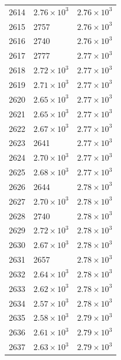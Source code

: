 \begin{table}[H]
\begin{tabular}{lll}
2614 & $\displaystyle 2.76 \times 10^{3}$ & $\displaystyle 2.76 \times 10^{3}$ \\
2615 & 2757 & $\displaystyle 2.76 \times 10^{3}$ \\
2616 & 2740 & $\displaystyle 2.76 \times 10^{3}$ \\
2617 & 2777 & $\displaystyle 2.77 \times 10^{3}$ \\
2618 & $\displaystyle 2.72 \times 10^{3}$ & $\displaystyle 2.77 \times 10^{3}$ \\
2619 & $\displaystyle 2.71 \times 10^{3}$ & $\displaystyle 2.77 \times 10^{3}$ \\
2620 & $\displaystyle 2.65 \times 10^{3}$ & $\displaystyle 2.77 \times 10^{3}$ \\
2621 & $\displaystyle 2.65 \times 10^{3}$ & $\displaystyle 2.77 \times 10^{3}$ \\
2622 & $\displaystyle 2.67 \times 10^{3}$ & $\displaystyle 2.77 \times 10^{3}$ \\
2623 & 2641 & $\displaystyle 2.77 \times 10^{3}$ \\
2624 & $\displaystyle 2.70 \times 10^{3}$ & $\displaystyle 2.77 \times 10^{3}$ \\
2625 & $\displaystyle 2.68 \times 10^{3}$ & $\displaystyle 2.77 \times 10^{3}$ \\
2626 & 2644 & $\displaystyle 2.78 \times 10^{3}$ \\
2627 & $\displaystyle 2.70 \times 10^{3}$ & $\displaystyle 2.78 \times 10^{3}$ \\
2628 & 2740 & $\displaystyle 2.78 \times 10^{3}$ \\
2629 & $\displaystyle 2.72 \times 10^{3}$ & $\displaystyle 2.78 \times 10^{3}$ \\
2630 & $\displaystyle 2.67 \times 10^{3}$ & $\displaystyle 2.78 \times 10^{3}$ \\
2631 & 2657 & $\displaystyle 2.78 \times 10^{3}$ \\
2632 & $\displaystyle 2.64 \times 10^{3}$ & $\displaystyle 2.78 \times 10^{3}$ \\
2633 & $\displaystyle 2.62 \times 10^{3}$ & $\displaystyle 2.78 \times 10^{3}$ \\
2634 & $\displaystyle 2.57 \times 10^{3}$ & $\displaystyle 2.78 \times 10^{3}$ \\
2635 & $\displaystyle 2.58 \times 10^{3}$ & $\displaystyle 2.79 \times 10^{3}$ \\
2636 & $\displaystyle 2.61 \times 10^{3}$ & $\displaystyle 2.79 \times 10^{3}$ \\
2637 & $\displaystyle 2.63 \times 10^{3}$ & $\displaystyle 2.79 \times 10^{3}$ \\

\end{tabular}
\end{table}
